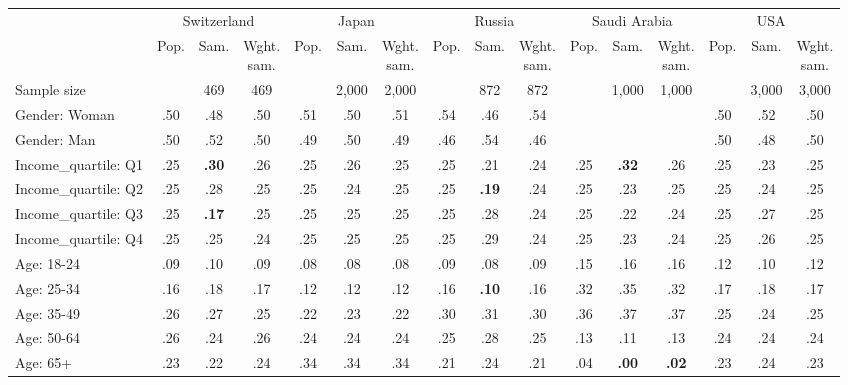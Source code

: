 
\begin{tabular}[t]{lccccccccccccccc}
\toprule
\multicolumn{1}{c}{} & \multicolumn{3}{c}{Switzerland} & \multicolumn{3}{c}{Japan} & \multicolumn{3}{c}{Russia} & \multicolumn{3}{c}{Saudi Arabia} & \multicolumn{3}{c}{USA} \\
\cmidrule(l{3pt}r{3pt}){2-4} \cmidrule(l{3pt}r{3pt}){5-7} \cmidrule(l{3pt}r{3pt}){8-10} \cmidrule(l{3pt}r{3pt}){11-13} \cmidrule(l{3pt}r{3pt}){14-16}
  & Pop. & Sam. & \makecell{Wght.\\sam.} & Pop. & Sam. & \makecell{Wght.\\sam.} & Pop. & Sam. & \makecell{Wght.\\sam.} & Pop. & Sam. & \makecell{Wght.\\sam.} & Pop. & Sam. & \makecell{Wght.\\sam.}\\
\midrule
Sample size &  & 469 & 469 &  & 2,000 & 2,000 &  & 872 & 872 &  & 1,000 & 1,000 &  & 3,000 & 3,000\\
\addlinespace
Gender: Woman & .50 & .48 & .50 & .51 & .50 & .51 & .54 & .46 & .54 &  &  &  & .50 & .52 & .50\\
Gender: Man & .50 & .52 & .50 & .49 & .50 & .49 & .46 & .54 & .46 &  &  &  & .50 & .48 & .50\\
\addlinespace
Income\_quartile: Q1 & .25 & \textbf{.30} & .26 & .25 & .26 & .25 & .25 & .21 & .24 & .25 & \textbf{.32} & .26 & .25 & .23 & .25\\
Income\_quartile: Q2 & .25 & .28 & .25 & .25 & .24 & .25 & .25 & \textbf{.19} & .24 & .25 & .23 & .25 & .25 & .24 & .25\\
Income\_quartile: Q3 & .25 & \textbf{.17} & .25 & .25 & .25 & .25 & .25 & .28 & .24 & .25 & .22 & .24 & .25 & .27 & .25\\
Income\_quartile: Q4 & .25 & .25 & .24 & .25 & .25 & .25 & .25 & .29 & .24 & .25 & .23 & .24 & .25 & .26 & .25\\
\addlinespace
Age: 18-24 & .09 & .10 & .09 & .08 & .08 & .08 & .09 & .08 & .09 & .15 & .16 & .16 & .12 & .10 & .12\\
Age: 25-34 & .16 & .18 & .17 & .12 & .12 & .12 & .16 & \textbf{.10} & .16 & .32 & .35 & .32 & .17 & .18 & .17\\
Age: 35-49 & .26 & .27 & .25 & .22 & .23 & .22 & .30 & .31 & .30 & .36 & .37 & .37 & .25 & .24 & .25\\
Age: 50-64 & .26 & .24 & .26 & .24 & .24 & .24 & .25 & .28 & .25 & .13 & .11 & .13 & .24 & .24 & .24\\
Age: 65+ & .23 & .22 & .24 & .34 & .34 & .34 & .21 & .24 & .21 & .04 & \textbf{.00} & \textbf{.02} & .23 & .24 & .23\\

\end{tabular}
